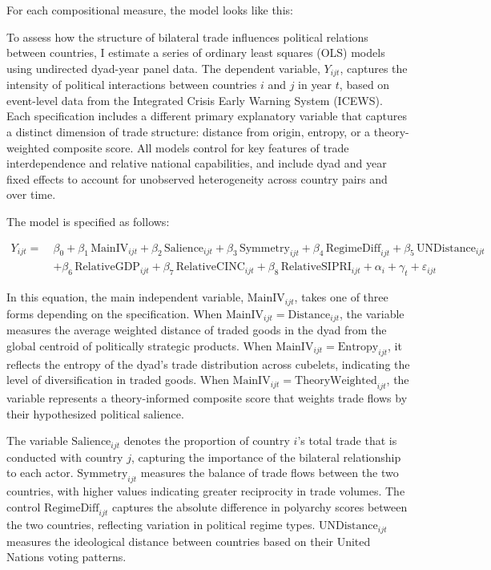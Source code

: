 \documentclass[12pt]{article}
\begin{document}
For each compositional measure, the model looks like this:



To assess how the structure of bilateral trade influences political relations between countries, I estimate a series of ordinary least squares (OLS) models using undirected dyad-year panel data. The dependent variable, \( Y_{ijt} \), captures the intensity of political interactions between countries \( i \) and \( j \) in year \( t \), based on event-level data from the Integrated Crisis Early Warning System (ICEWS). Each specification includes a different primary explanatory variable that captures a distinct dimension of trade structure: distance from origin, entropy, or a theory-weighted composite score. All models control for key features of trade interdependence and relative national capabilities, and include dyad and year fixed effects to account for unobserved heterogeneity across country pairs and over time.

The model is specified as follows:

\begin{equation}
\begin{aligned}
Y_{ijt} =\ & \beta_0 + \beta_1 \, \text{MainIV}_{ijt} + \beta_2 \, \text{Salience}_{ijt} + \beta_3 \, \text{Symmetry}_{ijt}
+ \beta_4 \, \text{RegimeDiff}_{ijt} + \beta_5 \, \text{UNDistance}_{ijt} \\
& + \beta_6 \, \text{RelativeGDP}_{ijt} + \beta_7 \, \text{RelativeCINC}_{ijt} + \beta_8 \, \text{RelativeSIPRI}_{ijt}
+ \alpha_i + \gamma_t + \varepsilon_{ijt}
\end{aligned}
\end{equation}

In this equation, the main independent variable, \( \text{MainIV}_{ijt} \), takes one of three forms depending on the specification. When \( \text{MainIV}_{ijt} = \text{Distance}_{ijt} \), the variable measures the average weighted distance of traded goods in the dyad from the global centroid of politically strategic products. When \( \text{MainIV}_{ijt} = \text{Entropy}_{ijt} \), it reflects the entropy of the dyad's trade distribution across cubelets, indicating the level of diversification in traded goods. When \( \text{MainIV}_{ijt} = \text{TheoryWeighted}_{ijt} \), the variable represents a theory-informed composite score that weights trade flows by their hypothesized political salience.

The variable \( \text{Salience}_{ijt} \) denotes the proportion of country \( i \)’s total trade that is conducted with country \( j \), capturing the importance of the bilateral relationship to each actor. \( \text{Symmetry}_{ijt} \) measures the balance of trade flows between the two countries, with higher values indicating greater reciprocity in trade volumes. The control \( \text{RegimeDiff}_{ijt} \) captures the absolute difference in polyarchy scores between the two countries, reflecting variation in political regime types. \( \text{UNDistance}_{ijt} \) measures the ideological distance between countries based on their United Nations voting patterns.
\end{document}
